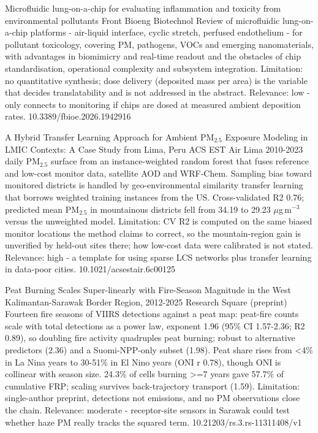 \documentclass[10pt]{article}
\begin{document}
{Microfluidic lung-on-a-chip for evaluating inflammation and toxicity from environmental pollutants}
{Front Bioeng Biotechnol}
{Review of microfluidic lung-on-a-chip platforms - air-liquid interface, cyclic stretch, perfused endothelium - for pollutant toxicology, covering PM, pathogens, VOCs and emerging nanomaterials, with advantages in biomimicry and real-time readout and the obstacles of chip standardisation, operational complexity and subsystem integration. Limitation: no quantitative synthesis; dose delivery (deposited mass per area) is the variable that decides translatability and is not addressed in the abstract. Relevance: low - only connects to monitoring if chips are dosed at measured ambient deposition rates.}
{10.3389/fbioe.2026.1942916}

\par{}\baselineskip{}\baselineskip
{}

{A Hybrid Transfer Learning Approach for Ambient PM$_{2.5}$ Exposure Modeling in LMIC Contexts: A Case Study from Lima, Peru}
{ACS EST Air}
{Lima 2010-2023 daily PM$_{2.5}$ surface from an instance-weighted random forest that fuses reference and low-cost monitor data, satellite AOD and WRF-Chem. Sampling bias toward monitored districts is handled by geo-environmental similarity transfer learning that borrows weighted training instances from the US. Cross-validated R2 0.76; predicted mean PM$_{2.5}$ in mountainous districts fell from 34.19 to 29.23 $\mu$g\,m$^{-3}$ versus the unweighted model. Limitation: CV R2 is computed on the same biased monitor locations the method claims to correct, so the mountain-region gain is unverified by held-out sites there; how low-cost data were calibrated is not stated. Relevance: high - a template for using sparse LCS networks plus transfer learning in data-poor cities.}
{10.1021/acsestair.6c00125}

{Peat Burning Scales Super-linearly with Fire-Season Magnitude in the West Kalimantan-Sarawak Border Region, 2012-2025}
{Research Square (preprint)}
{Fourteen fire seasons of VIIRS detections against a peat map: peat-fire counts scale with total detections as a power law, exponent 1.96 (95\% CI 1.57-2.36; R2 0.89), so doubling fire activity quadruples peat burning; robust to alternative predictors (2.36) and a Suomi-NPP-only subset (1.98). Peat share rises from <4\% in La Nina years to 30-51\% in El Nino years (ONI r 0.78), though ONI is collinear with season size. 24.3\% of cells burning >=7 years gave 57.7\% of cumulative FRP; scaling survives back-trajectory transport (1.59). Limitation: single-author preprint, detections not emissions, and no PM observations close the chain. Relevance: moderate - receptor-site sensors in Sarawak could test whether haze PM really tracks the squared term.}
{10.21203/rs.3.rs-11311408/v1}
\end{document}
